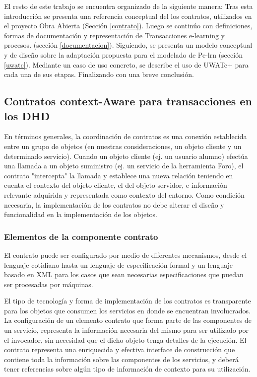 El resto de este trabajo se encuentra organizado de la siguiente manera: Tras
esta introducción se presenta una referencia conceptual del los contratos,
utilizados en el proyecto Obra Abierta (Sección \ref{contrato}). Luego se
continúo con definiciones, formas de documentación y representación de
Transacciones e-learning y procesos. (sección \ref{documentacion}). Siguiendo,
se presenta un modelo conceptual y de diseño sobre la adaptación propuesta para
el modelado de Pe-lrn (sección \ref{uwatc}). Mediante un caso de uso concreto,
se describe el uso de UWATc+ para cada una de sus etapas. Finalizando con una
breve conclusión.


\subsection{Contratos context-Aware para transacciones en los DHD} \label{contrato7}

En términos generales, la coordinación de contratos es una conexión establecida
entre un grupo de objetos (en nuestras consideraciones, un objeto cliente y un
determinado servicio). Cuando un objeto cliente (ej. un usuario alumno) efectúa
una llamada a un objeto suministro (ej. un servicio de la herramienta Foro), el
contrato "intercepta" la llamada y establece una nueva relación teniendo en
cuenta el contexto del objeto cliente, el del objeto servidor, e información
relevante adquirida y representada como contexto del entorno. Como condición
necesaria, la implementación de los contratos no debe alterar el diseño y
funcionalidad en la implementación de los objetos.


\subsubsection {Elementos de la componente contrato}

El contrato puede ser configurado por medio de diferentes mecanismos, desde el
lenguaje cotidiano hasta un lenguaje de especificación formal y un lenguaje
basado en XML para los casos que sean necesarias especificaciones que puedan ser
procesadas por máquinas. 

El tipo de tecnología y forma de implementación de los contratos es transparente
para los objetos que consumen los servicios en donde se encuentran involucrados.
La configuración de un elemento contrato que forma parte de  las componentes de
un servicio, representa la información necesaria del mismo para ser utilizado
por el invocador, sin necesidad que el dicho objeto tenga detalles de la
ejecución.
El contrato representa una enriquecida y efectiva interface de construcción que
contiene toda la información sobre las componentes de los servicios, y deberá
tener referencias sobre algún tipo de información de contexto para su
utilización.

